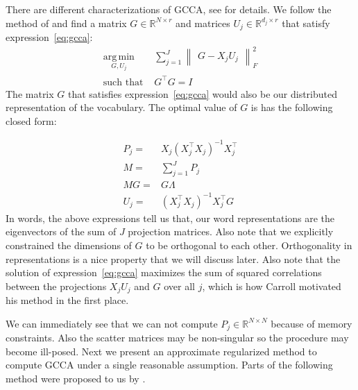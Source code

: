 \documentclass[11pt]{article}
\begin{document}
There are different characterizations of GCCA, see
\cite{kettenring1971canonical} for details. We follow the method
of \cite{carroll1968generalization} and find
 a matrix $G \in \mathbb{R}^{N\times r}$ and matrices  $U_j \in
 \mathbb{R}^{d_j \times r}$ that satisfy expression~\ref{eq:gcca}:
\begin{equation}
  \label{eq:gcca}
\begin{split}
  \operatorname*{\arg\,\min}_{G,U_j} & \sum_{j=1}^J \begin{Vmatrix} G - X_jU_j \end{Vmatrix}^2_F \\
  \text{such that } & G^\top G = I
\end{split}
\end{equation}
The matrix $G$ that satisfies expression~\ref{eq:gcca} would also be our
distributed representation of the vocabulary.
The optimal value of $G$ is has the following closed form:

\begin{align}
P_j =& X_j(X_j^\top X_j)^{-1}X_j^\top \label{eq:pp}\\
M =& \sum_{j=1}^J P_j \label{eq:mm}\\
M G =& G \Lambda\\
U_j =& \left(X_j^\top X_j\right)^{-1} X_j^\top G
\end{align}
In words, the above
expressions tell us that, our word representations are the
eigenvectors of the sum of $J$ projection matrices. Also note that we
explicitly constrained the dimensions of $G$ to be orthogonal to each other. Orthogonality in
representations is a nice property that we will discuss later. Also note that
the solution of expression~\ref{eq:gcca} maximizes the sum
of squared correlations between the projections $X_jU_j$ and $G$ over
all $j$, which is how Carroll motivated his method in the first place.

We can immediately see that we can not compute
 $P_j \in \mathbb{R}^{N \times N}$ because of memory constraints.
Also the
scatter matrices may be non-singular so the procedure may become
ill-posed. Next we present an approximate regularized method
to compute GCCA under a single reasonable assumption. Parts of the
following method were proposed to us by \cite{savostyanov}.
\end{document}
